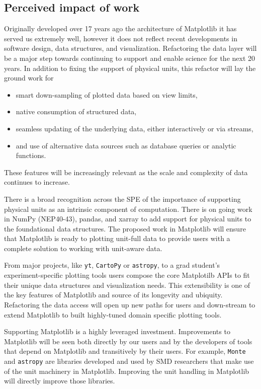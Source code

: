 \documentclass[12pt]{article}
\numberwithin{page}{section}
\begin{document}
\subsection{Perceived impact of work}


Originally developed over 17 years ago the architecture of Matplotlib
it has served us extremely well, however it does not reflect recent
developments in software design, data structures, and visualization.
Refactoring the data layer will be a major step towards continuing to
support and enable science for the next 20 years.  In addition to fixing
the support of physical units, this refactor will lay the ground work for
\begin{itemize}[noitemsep]
  \item smart down-sampling of plotted data based on view limits,
  \item native consumption of structured data,
  \item seamless updating of the underlying data, either interactively
    or via streams,
  \item and use of alternative data sources such as database queries
    or analytic functions.
\end{itemize}
These features will be increasingly relevant as the scale and complexity
of data continues to increase.


There is a broad recognition across the SPE of the importance of
supporting physical units as an intrinsic component of computation.
There is on going work in NumPy (NEP40-43), pandas, and xarray to add
support for physical units to the foundational data structures.  The
proposed work in Matplotlib will ensure that Matplotlib is ready to
plotting unit-full data to provide users with a complete solution to
working with unit-aware data.

From major projects, like \texttt{yt}, \texttt{CartoPy} or
\texttt{astropy}, to a grad student's experiment-specific plotting
tools users compose the core Matplotilb APIs to fit their unique data
structures and visualization needs.  This extensibility is one of the
key features of Matplotlib and source of its longevity and ubiquity.
Refactoring the data access will open up new paths for users and
down-stream to extend Matplotlib to built highly-tuned domain specific
plotting tools.

Supporting Matplotlib is a highly leveraged investment.  Improvements
to Matplotlib will be seen both directly by our users and by the
developers of tools that depend on Matplotlib and transitively by
their users.  For example, \texttt{Monte} and
\texttt{astropy} are libraries developed and used by SMD researchers
that make use of the unit machinery in Matplotlib.   Improving the
unit handling in Matplotlib will directly improve those libraries.
\end{document}
